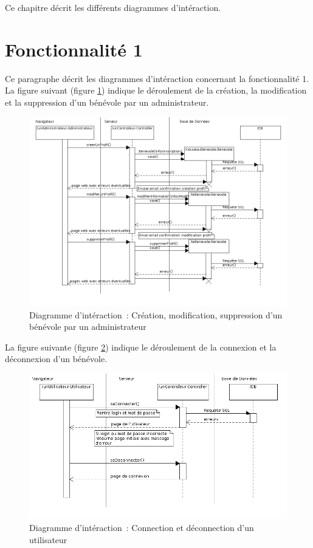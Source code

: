 Ce chapitre décrit les différents diagrammes d'intéraction.

\section{Fonctionnalité 1}
Ce paragraphe décrit les diagrammes d'intéraction concernant la fonctionnalité 1. \\

La figure suivant (figure \ref{diagrammeInteraction1}) indique le déroulement de la création, la modification et la suppression d'un bénévole par un administrateur.
\begin{figure}[H]
	\centering
	\includegraphics[scale=0.57]{images/diagrammesInteraction/01_diagrammeInteractionF1.png}
	\caption{Diagramme d'intéraction~: Création, modification, suppression d'un bénévole par un administrateur}
	\label{diagrammeInteraction1}
\end{figure}

La figure suivante (figure \ref{diagrammeInteraciton2}) indique le déroulement de la connexion et la déconnexion d'un bénévole.
\begin{figure}[H]
	\centering
	\includegraphics[scale=0.65]{images/diagrammesInteraction/02_diagrammeInteractionF1.png}
	\caption{Diagramme d'intéraction~: Connection et déconnection d'un utilisateur}
	\label{diagrammeInteraciton2}
\end{figure}

